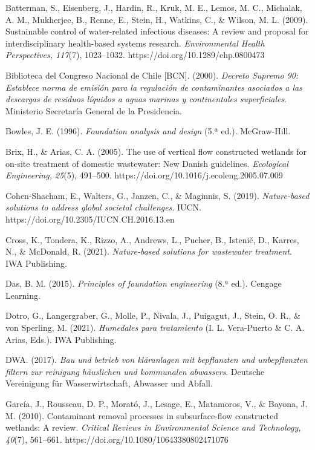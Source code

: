 \documentclass[12pt, letterpaper]{report}
\begin{document}
Batterman, S., Eisenberg, J., Hardin, R., Kruk, M. E., Lemos, M. C., Michalak, A. M., Mukherjee, B., Renne, E., Stein, H., Watkins, C., \& Wilson, M. L. (2009). Sustainable control of water-related infectious diseases: A review and proposal for interdisciplinary health-based systems research. \textit{Environmental Health Perspectives, 117}(7), 1023--1032. https://doi.org/10.1289/ehp.0800473

Biblioteca del Congreso Nacional de Chile [BCN]. (2000). \textit{Decreto Supremo 90: Establece norma de emisión para la regulación de contaminantes asociados a las descargas de residuos líquidos a aguas marinas y continentales superficiales}. Ministerio Secretaría General de la Presidencia.

Bowles, J. E. (1996). \textit{Foundation analysis and design} (5.ª ed.). McGraw-Hill.

Brix, H., \& Arias, C. A. (2005). The use of vertical flow constructed wetlands for on-site treatment of domestic wastewater: New Danish guidelines. \textit{Ecological Engineering, 25}(5), 491--500. https://doi.org/10.1016/j.ecoleng.2005.07.009

Cohen-Shacham, E., Walters, G., Janzen, C., \& Maginnis, S. (2019). \textit{Nature-based solutions to address global societal challenges}. IUCN. https://doi.org/10.2305/IUCN.CH.2016.13.en

Cross, K., Tondera, K., Rizzo, A., Andrews, L., Pucher, B., Istenič, D., Karres, N., \& McDonald, R. (2021). \textit{Nature-based solutions for wastewater treatment}. IWA Publishing.

Das, B. M. (2015). \textit{Principles of foundation engineering} (8.ª ed.). Cengage Learning.

Dotro, G., Langergraber, G., Molle, P., Nivala, J., Puigagut, J., Stein, O. R., \& von Sperling, M. (2021). \textit{Humedales para tratamiento} (I. L. Vera-Puerto \& C. A. Arias, Eds.). IWA Publishing.

DWA. (2017). \textit{Bau und betrieb von kläranlagen mit bepflanzten und unbepflanzten filtern zur reinigung häuslichen und kommunalen abwassers}. Deutsche Vereinigung für Wasserwirtschaft, Abwasser und Abfall.

García, J., Rousseau, D. P., Morató, J., Lesage, E., Matamoros, V., \& Bayona, J. M. (2010). Contaminant removal processes in subsurface-flow constructed wetlands: A review. \textit{Critical Reviews in Environmental Science and Technology, 40}(7), 561--661. https://doi.org/10.1080/10643380802471076
\end{document}

